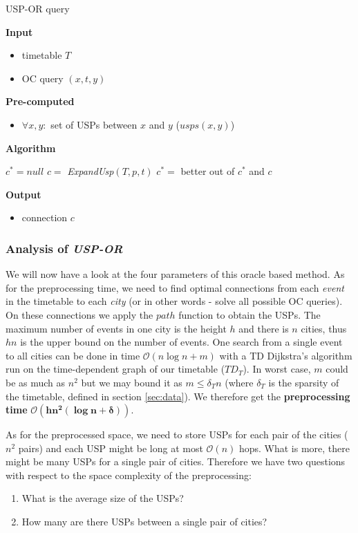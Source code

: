 	\color{algcolor}
	\begin{algorithm}[H]
		\color{inalgcolor}
		\caption{USP-OR query}
		\label{alg:uspor-query}
		\textbf{Input} 
		\begin{itemize}
			\item timetable $T$
			\item OC query $(x, t, y)$
		\end{itemize}
		\textbf{Pre-computed} 
		\begin{itemize}
			\item $\forall x, y:$ set of USPs between $x$ and $y$ ($usps(x, y)$)
		\end{itemize}
		\textbf{Algorithm}
		\begin{algorithmic}
			\STATE $c^{*} = null$
				\STATE $c =$ \textit{ExpandUsp}$(T, p, t)$
				\STATE $c^{*} =$ better out of $c^{*}$ and $c$
			\ENDFOR
		\end{algorithmic}
		\textbf{Output}
		\begin{itemize}
			\item connection $c$
		\end{itemize}
	\end{algorithm}
	\color{black}
	
	\subsubsection{Analysis of \textit{USP-OR}}	
	
		\noindent We will now have a look at the four parameters of this oracle based method. As for the preprocessing time, we need to find optimal connections from each \textit{event} in the timetable to each \textit{city} (or in other words - solve all possible OC queries). On these connections we apply the $path$ function to obtain the USPs. The maximum number of events in one city is the height $h$ and there is $n$ cities, thus $hn$ is the upper bound on the number of events. One search from a single event to all cities can be done in time $\mathcal{O}(n \log n + m)$ with a TD Dijkstra's algorithm run on the time-dependent graph of our timetable ($TD_{T}$). In worst case, $m$ could be as much as $n^{2}$ but we may bound it as $m \leq \delta_{T} n$ (where $\delta_{T}$ is the sparsity of the timetable, defined in section \ref{sec:data}). We therefore get the \textbf{preprocessing time} $\bm{\mathcal{O}(hn^{2} (\log n + \delta))}$. 
		
		As for the preprocessed space, we need to store USPs for each pair of the cities ($n^{2}$ pairs) and each USP might be long at most $\mathcal{O}(n)$ hops. What is more, there might be many USPs for a single pair of cities. Therefore we have two questions with respect to the space complexity of the preprocessing:
		\begin{enumerate}
			\item What is the average size of the USPs?
			\item How many are there USPs between a single pair of cities?
		\end{enumerate}
		\hspace*{\fill}
		
